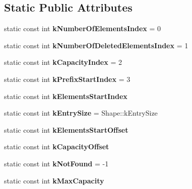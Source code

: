 \subsection*{Static Public Attributes}
\begin{DoxyCompactItemize}
\item 
\hypertarget{classv8_1_1internal_1_1_hash_table_afe952185c2fb01fd661eb0e92a1bcfd1}{}static const int {\bfseries k\+Number\+Of\+Elements\+Index} = 0\label{classv8_1_1internal_1_1_hash_table_afe952185c2fb01fd661eb0e92a1bcfd1}

\item 
\hypertarget{classv8_1_1internal_1_1_hash_table_ae515800ba4da4f135f342a43634fc9a5}{}static const int {\bfseries k\+Number\+Of\+Deleted\+Elements\+Index} = 1\label{classv8_1_1internal_1_1_hash_table_ae515800ba4da4f135f342a43634fc9a5}

\item 
\hypertarget{classv8_1_1internal_1_1_hash_table_a9489a4acf3b1c665300643412d43aeba}{}static const int {\bfseries k\+Capacity\+Index} = 2\label{classv8_1_1internal_1_1_hash_table_a9489a4acf3b1c665300643412d43aeba}

\item 
\hypertarget{classv8_1_1internal_1_1_hash_table_a36b32c729f1fbf093ac8c55e9479eb50}{}static const int {\bfseries k\+Prefix\+Start\+Index} = 3\label{classv8_1_1internal_1_1_hash_table_a36b32c729f1fbf093ac8c55e9479eb50}

\item 
static const int {\bfseries k\+Elements\+Start\+Index}
\item 
\hypertarget{classv8_1_1internal_1_1_hash_table_abdf5da3cbf7a54499e1c64e75de43857}{}static const int {\bfseries k\+Entry\+Size} = Shape\+::k\+Entry\+Size\label{classv8_1_1internal_1_1_hash_table_abdf5da3cbf7a54499e1c64e75de43857}

\item 
static const int {\bfseries k\+Elements\+Start\+Offset}
\item 
static const int {\bfseries k\+Capacity\+Offset}
\item 
\hypertarget{classv8_1_1internal_1_1_hash_table_a5554a4e4be4fa02d2b6b72ff4b5b8a90}{}static const int {\bfseries k\+Not\+Found} = -\/1\label{classv8_1_1internal_1_1_hash_table_a5554a4e4be4fa02d2b6b72ff4b5b8a90}

\item 
static const int {\bfseries k\+Max\+Capacity}
\end{DoxyCompactItemize}
